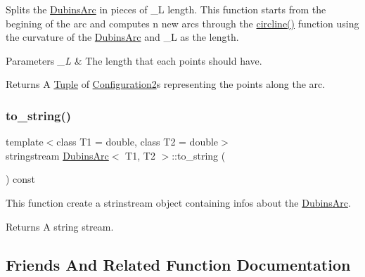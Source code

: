 Splits the {\ttfamily \mbox{\hyperlink{class_dubins_arc}{Dubins\+Arc}}} in pieces of \+\_\+L length. This function starts from the begining of the arc and computes n new arcs through the {\ttfamily \mbox{\hyperlink{dubins_8hh_adef8b363044d7fed558e5b47d8d6a3a0}{circline()}}} function using the curvature of the {\ttfamily \mbox{\hyperlink{class_dubins_arc}{Dubins\+Arc}}} and \+\_\+L as the length. 


\begin{DoxyParams}{Parameters}
{\em \+\_\+L} & The length that each points should have. \\
\hline
\end{DoxyParams}
\begin{DoxyReturn}{Returns}
A {\ttfamily \mbox{\hyperlink{class_tuple}{Tuple}}} of {\ttfamily \mbox{\hyperlink{class_configuration2}{Configuration2}}}s representing the points along the arc. 
\end{DoxyReturn}
\mbox{\label{class_dubins_arc_aa90c32f88f048e4e17ea79489f44dbfb}} 
\subsubsection{\texorpdfstring{to\_string()}{to\_string()}}
{\footnotesize\ttfamily template$<$class T1 = double, class T2 = double$>$ \\
stringstream \mbox{\hyperlink{class_dubins_arc}{Dubins\+Arc}}$<$ T1, T2 $>$\+::to\+\_\+string (\begin{DoxyParamCaption}{ }\end{DoxyParamCaption}) const\hspace{0.3cm}{\ttfamily [inline]}}

This function create a strinstream object containing infos about the {\ttfamily \mbox{\hyperlink{class_dubins_arc}{Dubins\+Arc}}}. \begin{DoxyReturn}{Returns}
A string stream. 
\end{DoxyReturn}


\subsection{Friends And Related Function Documentation}
\mbox{\label{class_dubins_arc_a9fbd2f7583b614eba51fd90a9def4b51}} 

